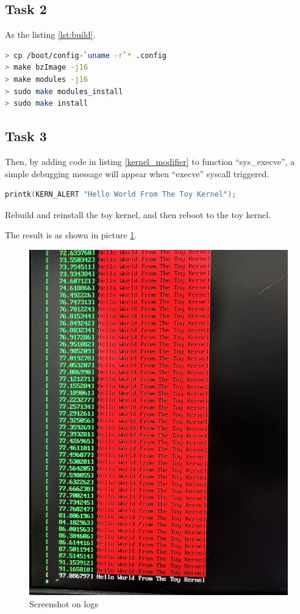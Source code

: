 \documentclass[12pt, a4paper, twocolumn]{article}
\begin{document}
\subsection{Task 2}

As the listing \ref{lst:build}.


\noindent\begin{minipage}{.45\textwidth}
\begin{lstlisting}[language=bash, caption=Build the kernel,frame=tlrb, label=lst:build]
> cp /boot/config-`uname -r`* .config
> make bzImage -j16
> make modules -j16
> sudo make modules_install
> sudo make install
\end{lstlisting}
\end{minipage}\hfill


\subsection{Task 3}

Then, by adding code in listing \ref{kernel_modifier} to function ``sys\_execve'',
a simple debugging message will appear when ``execve'' syscall triggered.


\noindent\begin{minipage}{.45\textwidth}
\begin{lstlisting}[language=C, caption=Add A Debug Message, frame=tlrb, label=kernel_modifier]
printk(KERN_ALERT "Hello World From The Toy Kernel");
\end{lstlisting}
\end{minipage}\hfill


Rebuild and reinstall the toy kernel, and then reboot to the toy kernel.

The result is as shown in picture \ref{fig:1}.

\begin{figure}
\includegraphics[width=.98\linewidth]{picture/1.jpg}
\caption{Screenshot on logs}
\label{fig:1}
\end{figure}
\end{document}
